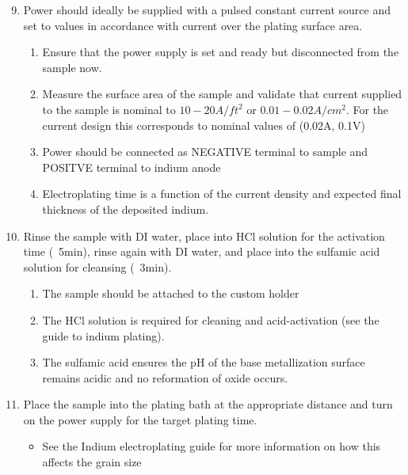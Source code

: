 \begin{center} %
    \begin{framed} %
        \begin{minipage}{0.8\textwidth} %
        \raggedright %

        \begin{enumerate}
            \setcounter{enumi}{8}
            \item Power should ideally be supplied with a pulsed constant current source and set to values in accordance with current over the plating surface area.
            \begin{enumerate}
                \item Ensure that the power supply is set and ready but disconnected from the sample now.
                \item Measure the surface area of the sample and validate that current supplied to the sample is nominal to $10-20A/ft^2$ or $0.01-0.02A/cm^2$. For the current design this corresponds to nominal values of (0.02A, 0.1V)
                \item Power should be connected as NEGATIVE terminal to sample and POSITVE terminal to indium anode
                \item Electroplating time is a function of the current density and expected final thickness of the deposited indium.
            \end{enumerate}

            \item Rinse the sample with DI water, place into HCl solution for the activation time (~5min), rinse again with DI water, and place into the sulfamic acid solution for cleansing (~3min).
            \begin{enumerate}
                \item The sample should be attached to the custom holder
                \item The HCl solution is required for cleaning and acid-activation (see the guide to indium plating).
                \item The sulfamic acid ensures the pH of the base metallization surface remains acidic and no reformation of oxide occurs.
            \end{enumerate}

            \item Place the sample into the plating bath at the appropriate distance and turn on the power supply for the target plating time.
            \begin{itemize}
                \item See the Indium electroplating guide for more information on how this affects the grain size
            \end{itemize}
        \end{enumerate}


\end{minipage}
\end{framed}
\end{center}
